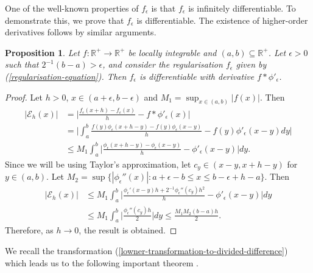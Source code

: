 \documentclass[12pt,a4paper]{amsart}
\newtheorem{proposition}[theorem]{Proposition}
\theoremstyle{definition}
\newcommand{\myabs}[1]{ | #1 | }
\begin{document}
	One of the well-known properties of $f_{\epsilon}$ is that $f_{\epsilon}$ is infinitely differentiable. To demonstrate this, we prove that $f_{\epsilon}$ is differentiable. The existence of higher-order derivatives follows by similar arguments.
	\begin{proposition}\label{regularisation-is-infinitely-differentiable}
		Let $f: \mathbb{R}^{+} \rightarrow \mathbb{R}^{+}$ be locally integrable and $(a, b) \subseteq \mathbb{R}^{+}$. Let $\epsilon > 0$ such that $2^{-1}(b-a) > \epsilon$, and consider 
		the regularisation $f_{\epsilon}$ given by (\ref{regularisation-equation}). Then $f_{\epsilon}$ is differentiable with derivative $f \ast \phi'_{\epsilon}$.
	\end{proposition}
	\begin{proof}
		Let $h > 0$, $x \in (a+\epsilon, b - \epsilon)$ and $\displaystyle M_1 = \sup_{x \in (a, b)}  \myabs{f(x)}$. Then 
		\begin{align*}
			\myabs{ \mathcal{E}_h(x) } &= \bigg\vert \frac{f_{\epsilon}(x+h) - f_{\epsilon}(x)  }{h} - f \ast \phi'_{\epsilon}(x) \bigg\vert \\
			&= \bigg\vert \int^{b}_{a}  \frac{ f(y) \phi_{\epsilon}(x+h -y) - f(y)\phi_{\epsilon}(x -y)}{h} -f(y)\phi'_{\epsilon}(x-y) dy \bigg\vert  \\ 
			&\leq M_1 \int^{b}_{a} \bigg\vert \frac{\phi_{\epsilon}(x+h -y)  -\phi_{\epsilon}(x-y)}{h} - \phi'_{\epsilon}(x-y) \bigg\vert dy.  
		\end{align*}
		Since we will be using Taylor's approximation, let $c_y \in (x-y, x +h -y)$ for $y \in (a, b)$. Let $\displaystyle M_2 = \sup \lbrace \myabs{\phi_{\epsilon}''(x)}: a + \epsilon - b \leq x \leq b-\epsilon + h -a\rbrace$. Then
		\begin{align*}
			\myabs{\mathcal{E}_h(x)} &\leq M_1 \int^{b}_{a} \bigg\vert  \frac{\phi_{\epsilon}'(x-y)h + 2^{-1}\phi_{\epsilon}''(c_y)h^{2}}{h} - \phi'_{\epsilon}(x-y) \bigg\vert  dy \\
			&\leq M_1 \int^{b}_{a} \bigg\vert  \frac{\phi_{\epsilon}''(c_y)h}{2} \bigg\vert dy \leq \frac{M_1 M_2 (b-a)h}{2}.
		\end{align*}
		Therefore, as $h \rightarrow 0$, the result is obtained.
	\end{proof}
	
	We recall the transformation (\ref{lowner-transformation-to-divided-difference}) which leads us to the following important theorem \cite[Theorem 3.7]{hansen-fasttrack}.
	
\end{document}
